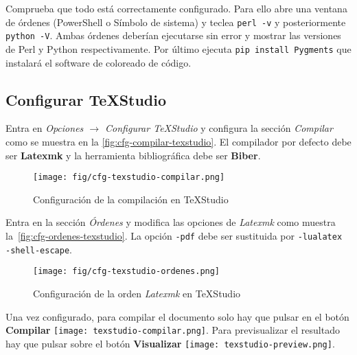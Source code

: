 Comprueba que todo está correctamente configurado.  Para ello abre una ventana de órdenes (PowerShell o Símbolo de sistema) y teclea \texttt{perl -v} y posteriormente \texttt{python -V}. Ambas órdenes deberían ejecutarse sin error y mostrar las versiones de Perl y Python respectivamente. Por último ejecuta \texttt{pip install Pygments} que instalará el software de coloreado de código.

\subsection{Configurar TeXStudio}

Entra en \emph{Opciones $\rightarrow$ Configurar TeXStudio} y configura la sección \emph{Compilar} como se muestra en la \autoref{fig:cfg-compilar-texstudio}. El compilador por defecto debe ser \textbf{Latexmk} y la herramienta bibliográfica debe ser \textbf{Biber}.

\begin{figure}
    \centering
    \texttt{[image: fig/cfg-texstudio-compilar.png]}
    \caption{Configuración de la compilación en TeXStudio}
    \label{fig:cfg-compilar-texstudio}
\end{figure}

Entra en la sección \emph{Órdenes} y modifica las opciones de \emph{Latexmk} como muestra la~\autoref{fig:cfg-ordenes-texstudio}. La opción \texttt{-pdf} debe ser sustituida por \texttt{-lualatex -shell-escape}.

\begin{figure}
    \centering
    \texttt{[image: fig/cfg-texstudio-ordenes.png]}
    \caption{Configuración de la orden \emph{Latexmk} en TeXStudio}
    \label{fig:cfg-ordenes-texstudio}
\end{figure}
Una vez configurado, para compilar el documento solo hay que pulsar en el botón \textbf{Compilar} \texttt{[image: texstudio-compilar.png]}. Para previsualizar el resultado hay que pulsar sobre el botón \textbf{Visualizar} \texttt{[image: texstudio-preview.png]}.
